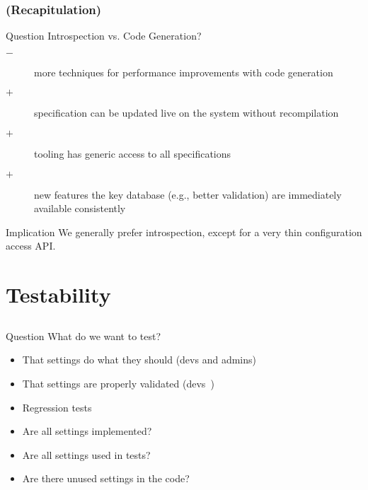 \begin{frame}
	\frametitle{(Recapitulation)}
	\begin{alertblock}{Question}
	Introspection vs. Code Generation?
	\end{alertblock}

	\pause
	\vspace{0.5em}

	\begin{description}
	\item[$-$] more techniques for performance improvements with code generation
	\item[$+$] specification can be updated live on the system without recompilation
	\item[$+$] tooling has generic access to all specifications
 	\item[$+$] new features the key database (e.g., better validation) are immediately available consistently
	\end{description}

	\vspace{0.5em}

	\begin{alertblock}{Implication}
	We generally prefer introspection, except for a very thin configuration access API.
	\end{alertblock}
\end{frame}


\section{Testability}

\subsection{}

\begin{frame}
	\begin{alertblock}{Question}
	What do we want to test?
	\end{alertblock}

	\pause
	\begin{itemize}
	\item That settings do what they should (devs and admins)
	\item That settings are properly validated (devs~\cite{xu2013blame})
	\item Regression tests~\cite{qu2008configuration}
	\pause
	\vspace{1em}
	\item Are all settings implemented?
	\item Are all settings used in tests?
	\item Are there unused settings in the code?
	\end{itemize}
\end{frame}

